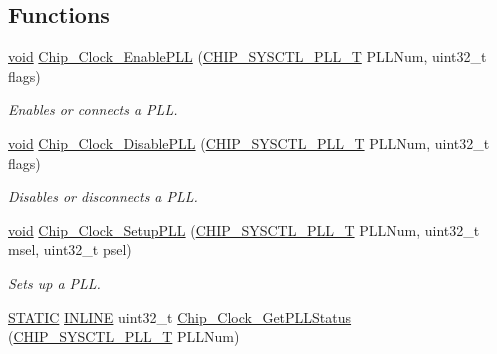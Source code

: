 \subsection*{Functions}
\begin{DoxyCompactItemize}
\item 
\hyperlink{Paradigm_2Tern__EE_2small_2portmacro_8h_a14d32f8130d3c0b212cfc751730b5b49}{void} \hyperlink{group__CLOCK__17XX__40XX_ga2f3b19dee294433937973fb4fedfe3f6}{Chip\-\_\-\-Clock\-\_\-\-Enable\-P\-L\-L} (\hyperlink{group__SYSCTL__17XX__40XX_ga5f5478a201b021ed04a0724bff524c4b}{C\-H\-I\-P\-\_\-\-S\-Y\-S\-C\-T\-L\-\_\-\-P\-L\-L\-\_\-\-T} P\-L\-L\-Num, uint32\-\_\-t flags)
\begin{DoxyCompactList}\small\item\em Enables or connects a P\-L\-L. \end{DoxyCompactList}\item 
\hyperlink{Paradigm_2Tern__EE_2small_2portmacro_8h_a14d32f8130d3c0b212cfc751730b5b49}{void} \hyperlink{group__CLOCK__17XX__40XX_ga3b9589b6a14d39653503be3693990f8f}{Chip\-\_\-\-Clock\-\_\-\-Disable\-P\-L\-L} (\hyperlink{group__SYSCTL__17XX__40XX_ga5f5478a201b021ed04a0724bff524c4b}{C\-H\-I\-P\-\_\-\-S\-Y\-S\-C\-T\-L\-\_\-\-P\-L\-L\-\_\-\-T} P\-L\-L\-Num, uint32\-\_\-t flags)
\begin{DoxyCompactList}\small\item\em Disables or disconnects a P\-L\-L. \end{DoxyCompactList}\item 
\hyperlink{Paradigm_2Tern__EE_2small_2portmacro_8h_a14d32f8130d3c0b212cfc751730b5b49}{void} \hyperlink{group__CLOCK__17XX__40XX_gaf4a2dd4c6aae5d6b830f7cf529ec8773}{Chip\-\_\-\-Clock\-\_\-\-Setup\-P\-L\-L} (\hyperlink{group__SYSCTL__17XX__40XX_ga5f5478a201b021ed04a0724bff524c4b}{C\-H\-I\-P\-\_\-\-S\-Y\-S\-C\-T\-L\-\_\-\-P\-L\-L\-\_\-\-T} P\-L\-L\-Num, uint32\-\_\-t msel, uint32\-\_\-t psel)
\begin{DoxyCompactList}\small\item\em Sets up a P\-L\-L. \end{DoxyCompactList}\item 
\hyperlink{group__LPC__Types__Public__Macros_ga10b2d890d871e1489bb02b7e70d9bdfb}{S\-T\-A\-T\-I\-C} \hyperlink{group__LPC__Types__Public__Types_ga2eb6f9e0395b47b8d5e3eeae4fe0c116}{I\-N\-L\-I\-N\-E} uint32\-\_\-t \hyperlink{group__CLOCK__17XX__40XX_ga30a134e114a19fdf625326f8258e4652}{Chip\-\_\-\-Clock\-\_\-\-Get\-P\-L\-L\-Status} (\hyperlink{group__SYSCTL__17XX__40XX_ga5f5478a201b021ed04a0724bff524c4b}{C\-H\-I\-P\-\_\-\-S\-Y\-S\-C\-T\-L\-\_\-\-P\-L\-L\-\_\-\-T} P\-L\-L\-Num)

\end{DoxyCompactItemize}
